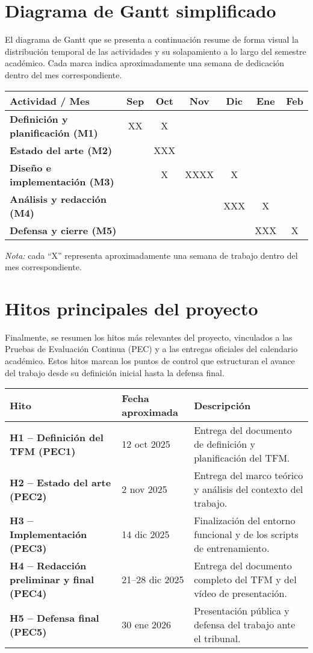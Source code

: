 \section{Diagrama de Gantt simplificado}

El diagrama de Gantt que se presenta a continuación resume de forma visual la distribución temporal de las actividades y su solapamiento a lo largo del semestre académico. Cada marca indica aproximadamente una semana de dedicación dentro del mes correspondiente.

\begin{center}
\renewcommand{\arraystretch}{1.2}
\begin{tabular}{|>{\bfseries}p{6cm}|c|c|c|c|c|c|}
\hline
Actividad / Mes & Sep & Oct & Nov & Dic & Ene & Feb \\
\hline
Definición y planificación (M1) & XX & X &  &  &  &  \\
\hline
Estado del arte (M2) &  & XXX &  &  &  &  \\
\hline
Diseño e implementación (M3) &  & X & XXXX & X &  &  \\
\hline
Análisis y redacción (M4) &  &  &  & XXX & X &  \\
\hline
Defensa y cierre (M5) &  &  &  &  & XXX & X \\
\hline
\end{tabular}
\end{center}

\noindent
\textit{Nota:} cada ``X'' representa aproximadamente una semana de trabajo dentro del mes correspondiente.


\section{Hitos principales del proyecto}

Finalmente, se resumen los hitos más relevantes del proyecto, vinculados a las Pruebas de Evaluación Continua (PEC) y a las entregas oficiales del calendario académico. Estos hitos marcan los puntos de control que estructuran el avance del trabajo desde su definición inicial hasta la defensa final.

\begin{longtable}{|>{\bfseries}p{2.8cm}|p{3cm}|p{9cm}|}
\hline
Hito & Fecha aproximada & Descripción \\
\hline
H1 -- Definición del TFM (PEC1) & 12 oct 2025 & Entrega del documento de definición y planificación del TFM. \\ \hline
H2 -- Estado del arte (PEC2) & 2 nov 2025 & Entrega del marco teórico y análisis del contexto del trabajo. \\ \hline
H3 -- Implementación (PEC3) & 14 dic 2025 & Finalización del entorno funcional y de los scripts de entrenamiento. \\ \hline
H4 -- Redacción preliminar y final (PEC4) & 21--28 dic 2025 & Entrega del documento completo del TFM y del vídeo de presentación. \\ \hline
H5 -- Defensa final (PEC5) & 30 ene 2026 & Presentación pública y defensa del trabajo ante el tribunal. \\ \hline
\end{longtable}



